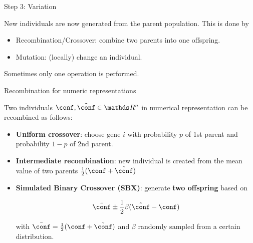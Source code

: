 \begin{frame}{Step 3: Variation}

New individuals are now generated from the parent population. This is done by

\begin{itemize}
\item Recombination/Crossover: combine two parents into one offspring.
\item Mutation: (locally) change an individual.
\end{itemize}

Sometimes only one operation is performed.

\end{frame}

\begin{frame}{Recombination for numeric representations}

Two individuals $\xx, \tilde\xx \in \R^n$ in numerical representation can be recombined as follows:

\begin{itemize}
\item \textbf{Uniform crossover}: choose gene $i$ with probability $p$ of 1st parent and probability $1-p$ of 2nd parent.
\item \textbf{Intermediate recombination}: new individual is created from the mean value of two parents $\frac{1}{2}(\xx + \tilde\xx)$
\item \textbf{Simulated Binary Crossover (SBX)}: generate \textbf{two offspring} based on

$$
\bar\xx \pm \frac{1}{2} \beta (\tilde\xx - \xx)
$$

with $\bar\xx = \frac{1}{2} (\xx + \tilde\xx)$ and $\beta$ randomly sampled from a certain distribution.
\end{itemize}

\end{frame}

